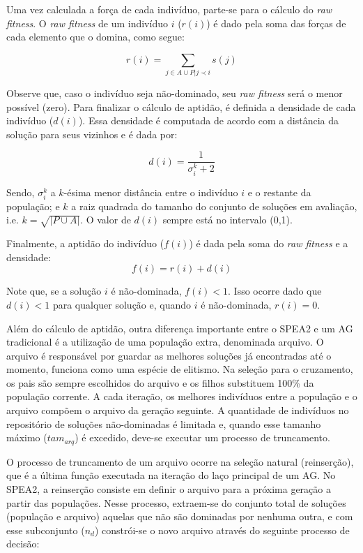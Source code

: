 Uma vez calculada a força de cada indivíduo, parte-se para o cálculo do \textit{raw fitness}. O \textit{raw fitness} de um indivíduo $i$ ($r(i)$) é dado pela soma das forças de cada elemento que o domina, como segue:

\begin{equation}r(i) = \sum_{j \in A \cup P | j \prec i} s(j)\end{equation}

Observe que, caso o indivíduo seja não-dominado, seu \textit{raw fitness} será o menor possível (zero). Para finalizar o cálculo de aptidão, é definida a densidade de cada indivíduo ($d(i)$). Essa densidade é computada de acordo com a distância da solução para seus vizinhos e é dada por:

\begin{equation}d(i) = \frac{1}{\sigma_i^k + 2}\end{equation}

Sendo, $\sigma_i^k$ a $k$-ésima menor distância entre o indivíduo $i$ e o restante da população; e $k$ a raiz quadrada do tamanho do conjunto de soluções em avaliação, i.e. $k = \sqrt{|P \cup A|}$. O valor de $d(i)$ sempre está no intervalo (0,1).

Finalmente, a aptidão do indivíduo ($f(i)$) é dada pela soma do \textit{raw fitness} e a densidade: 
\begin{equation}f(i) = r(i) + d(i)\end{equation}

Note que, se a solução $i$ é não-dominada, $f(i) < 1$. Isso ocorre dado que $d(i) < 1$ para qualquer solução e, quando $i$ é não-dominada, $r(i) = 0$.


Além do cálculo de aptidão, outra diferença importante entre o SPEA2 e um AG tradicional é a utilização de uma população extra, denominada arquivo. O arquivo é responsável por guardar as melhores soluções já encontradas até o momento, funciona como uma espécie de elitismo. Na seleção para o cruzamento, os pais são sempre escolhidos do arquivo e os filhos substituem 100\% da população corrente. A cada iteração, os melhores indivíduos entre a população e o arquivo compõem o arquivo da geração seguinte. A quantidade de indivíduos no repositório de soluções não-dominadas é limitada e, quando esse tamanho máximo ($tam_{arq}$) é excedido, deve-se executar um processo de truncamento.

O processo de truncamento de um arquivo ocorre na seleção natural (reinserção), que é a última função executada na iteração do laço principal de um AG. No SPEA2, a reinserção consiste em definir o arquivo para a próxima geração a partir das populações. Nesse processo, extraem-se do conjunto total de soluções (população e arquivo) aquelas que não são dominadas por nenhuma outra, e com esse subconjunto ($n_d$) constrói-se o novo arquivo através do seguinte processo de decisão:

